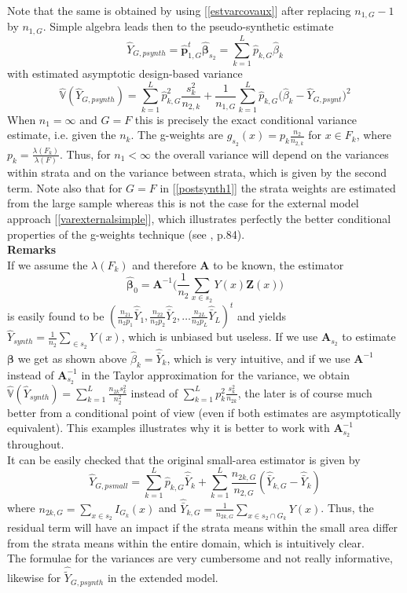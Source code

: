 \documentclass[a4paper,12pt,leqno, titlepage]{article}
\newcommand{\VAR}{\mathbb{V}}
\begin{document}
Note that the same is obtained by using [\ref{estvarcovaux}] after replacing $n_{1,G}-1$ by $n_{1,G}$. Simple algebra leads then to the pseudo-synthetic estimate
\begin{equation}\label{postsynth1}
\hat{Y}_{G,psynth}=\hat{\pmb{p}}_{1,G}^t\hat{\pmb{\beta}}_{s_2}=\sum_{k=1}^L\hat{p}_{k,G}\hat{\beta}_k
\end{equation}
with estimated asymptotic design-based variance
\begin{equation}\label{postsynth1}
\hat{\VAR}(\hat{Y}_{G,psynth})=\sum_{k=1}^L\hat{p}^2_{k,G}\frac{s_k^2}{n_{2,k}} +
\frac{1}{n_{1,G}}\sum_{k=1}^L \hat{p}_{k,G}\big(\hat{\beta}_k-\hat{Y}_{G,psynt}\big)^2
\end{equation}
When $n_1=\infty$ and $G=F$ this is precisely the exact conditional variance estimate, i.e. given the $n_k$. The g-weights are $g_{s_2}(x)=p_k\frac{n_2}{n_{2,k}}$ for $x\in{F}_k$, where $p_k=\frac{\lambda(F_k)}{\lambda(F)}$. Thus, for $n_1 < \infty$ the overall variance will depend on the variances within strata and on the variance between strata, which is given by the second term. Note also that for $G=F$ in [\ref{postsynth1}] the strata weights are estimated from the large sample whereas this is not the case for the external model approach [\ref{varexternalsimple}], which illustrates perfectly the better conditional properties of the g-weights technique (see \cite{mandallaz}, p.84).\\
\noindent\textbf{Remarks}\\
\noindent If we assume the $\lambda(F_k)$ and therefore $\pmb{A}$ to be known, the estimator $$\hat{\pmb{\beta}}_0=\pmb{A}^{-1}\Big(\frac{1}{n_2}\sum_{x\in{s_2}}Y(x)\pmb{Z}(x)\Big)$$ is easily found to be $(\frac{n_{21}}{n_2p_1}\hat{\bar{Y}}_1, \frac{n_{22}}{n_2p_2}\hat{\bar{Y}}_2,\ldots \frac{n_{2L}}{n_2p_L}\hat{\bar{Y}}_L)^t$ and yields $\hat{Y}_{synth}=\frac{1}{n_2}\sum_{\in{s_2}}Y(x)$, which is unbiased but useless. If we use $\pmb{A}_{s_2} $ to estimate $\pmb{\beta}$ we get as shown above $\hat{\beta}_k=\hat{\bar{Y}}_k$, which is very intuitive, and if we use $\pmb{A}^{-1}$ instead of $\pmb{A}^{-1}_{s_2}$ in the Taylor approximation for the variance, we obtain $\hat{\VAR}(\hat{Y}_{synth})=\sum_{k=1}^L\frac{n_{2k}s_k^2}{n^2_2}$ instead of $\sum_{k=1}^L p_k^2 \frac{s_k^2}{n_{2k}}$, the later is of course much better from a conditional point of view (even if both estimates are asymptotically equivalent). This examples illustrates why it is better to work with $\pmb{A}^{-1}_{s_2}$ throughout.
\\
It can be easily checked that the original small-area estimator is given by
$$\hat{Y}_{G,psmall}=\sum_{k=1}^L \hat{p}_{k,G}\hat{\bar{Y}}_k+\sum_{k=1}^L\frac{n_{2k,G}}{n_{2,G}}
(\hat{\bar{Y}}_{k,G}-\hat{\bar{Y}}_k)$$
where $n_{2k,G}=\sum_{x\in{s_2}}I_{G_k}(x)$ and $\hat{\bar{Y}}_{k,G}=\frac{1}{n_{2k,G}}\sum_{x\in{s_2 \cap G_k}}Y(x)$. Thus, the residual term will have an impact if the strata means within the small area differ from the strata means within the entire domain, which is intuitively clear.
\\ The formulae for the variances are very cumbersome and not really informative, likewise for
$\hat{\tilde{Y}}_{G,psynth}$ in the extended model.
\newpage
\end{document}

